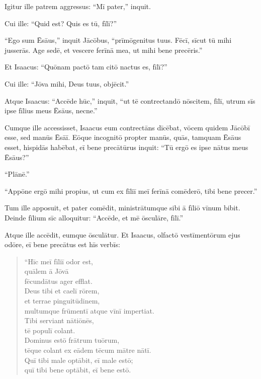 \Versus Igitur ille patrem aggressus: ``Mī pater,'' inquit.

Cui ille: ``Quid est? Quis es tū, fīlī?''

\Versus ``Ego sum Ēsāus,'' inquit Jācōbus, ``prīmōgenitus tuus. Fēcī, sīcut tū mihi jusserās. Age sedē, et vescere ferīnā mea, ut mihi bene precēris.''

\Versus Et Isaacus: ``Quōnam pactō tam citō nactus es, fīlī?''

Cui ille: ``Jōva mihi, Deus tuus, objēcit.''

\Versus Atque Isaacus: ``Accēde hūc,'' inquit, ``ut tē contrectandō nōscitem, fīlī, utrum sīs ipse fīlius meus Ēsāus, necne.''

\Versus Cumque ille accessisset, Isaacus eum contrectāns dīcēbat, vōcem quidem Jācōbī esse, sed manūs Ēsāī.
\Versus Eōque incognitō propter manūs, quās, tamquam Ēsāus esset, hispidās habēbat, eī bene precātūrus inquit:
\Versus ``Tū ergō es ipse nātus meus Ēsāus?''

``Plānē.''

\Versus ``Appōne ergō mihi propius, ut cum ex fīliī meī ferīnā comēderō, tibi bene precer.''

Tum ille apposuit, et pater comēdit, ministrātumque sibi ā fīliō vīnum bibit.
\Versus Deinde fīlium sīc alloquitur: ``Accēde, et mē ōsculāre, fīlī.''

\Versus Atque ille accēdit, eumque ōsculātur. Et Isaacus, olfactō vestīmentōrum ejus odōre, eī bene precātus est hīs verbīs:

\begin{verse}
\begin{patverse*}
``Hīc meī fīliī odor est,\\
 quālem ā Jōvā\\
 fēcundātus ager efflat.\\
\Versus Deus tibi et caelī rōrem,\\
 et terrae pinguitūdinem,\\
 multumque frūmentī atque vīnī impertiat.\\
\Versus Tibi serviant nātiōnēs,\\
 tē populī colant.\\
 Dominus estō frātrum tuōrum,\\
 tēque colant ex eādem tēcum mātre nātī.\\
 Quī tibi male optābit, eī male estō;\\
 quī tibi bene optābit, eī bene estō.
\end{patverse*}
\end{verse}

